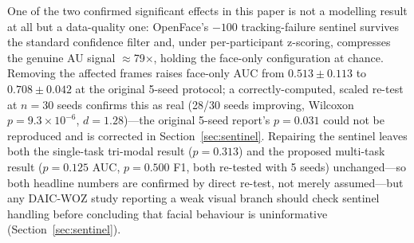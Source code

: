 \documentclass[journal]{IEEEtran}
\begin{document}
One of the two confirmed significant effects in this paper is not a
modelling result at all but a data-quality one: OpenFace's $-100$
tracking-failure sentinel survives the standard confidence filter and,
under per-participant z-scoring, compresses the genuine AU signal
$\approx$79$\times$, holding the face-only configuration at chance.
Removing the affected frames raises face-only AUC from
$0.513\pm0.113$ to $0.708\pm0.042$ at the original 5-seed protocol; a
correctly-computed, scaled re-test at $n{=}30$ seeds confirms this as
real (28/30 seeds improving, Wilcoxon $p{=}9.3{\times}10^{-6}$,
$d{=}1.28$)---the original 5-seed report's $p{=}0.031$ could not be
reproduced and is corrected in Section~\ref{sec:sentinel}. Repairing
the sentinel leaves both the single-task
tri-modal result ($p{=}0.313$) and the proposed multi-task result
($p{=}0.125$ AUC, $p{=}0.500$ F1, both re-tested with 5 seeds)
unchanged---so both headline numbers are confirmed by direct re-test,
not merely assumed---but any DAIC-WOZ study reporting a weak visual
branch should check sentinel handling before concluding that facial
behaviour is uninformative
(Section~\ref{sec:sentinel}).
\end{document}
